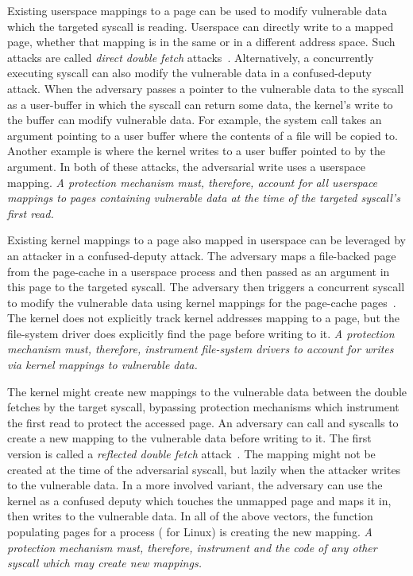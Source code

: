\documentclass[letterpaper,twocolumn,10pt]{article}
\begin{document}
Existing userspace mappings to a page can be used to modify 
vulnerable data which the targeted syscall is reading.
Userspace can directly write to a mapped page, whether that mapping is 
in the same or in a different address space. 
Such attacks are called \emph{direct double fetch} 
attacks~\cite{watson2007exploiting}.
Alternatively, a concurrently executing syscall can also modify the 
vulnerable data in a confused-deputy attack.
When the adversary passes a pointer to the vulnerable data to 
the syscall as a user-buffer in which the syscall can return some 
data, the kernel's write to the buffer can modify vulnerable data.
For example, the  system call takes an argument pointing 
to a user buffer where the contents of a file will be copied to.
Another example is  where the kernel writes to 
a user buffer pointed to by the  argument.
In both of these attacks, the adversarial write uses a userspace
mapping. 
\emph{A protection mechanism must, therefore, account for all userspace 
mappings to pages containing vulnerable data at the time of the 
targeted syscall's first read.}

Existing kernel mappings to a page also mapped in userspace can be 
leveraged by an attacker in a confused-deputy attack.
The adversary maps a file-backed page from the page-cache in a
userspace process and then passed as an argument in this page to the 
targeted syscall.
The adversary then triggers a concurrent  syscall to modify the 
vulnerable data using kernel mappings for the page-cache
pages~\cite{watson2007exploiting}.
The kernel does not explicitly track kernel addresses mapping to a page, 
but the file-system driver does explicitly find the page before writing to it.
\emph{A protection mechanism must, therefore, instrument file-system 
drivers to account for writes via kernel mappings to vulnerable data.}

The kernel might create new mappings to the vulnerable data 
between the double fetches by the target syscall, bypassing protection 
mechanisms which instrument the first read to protect the accessed page.
An adversary can call  and  syscalls to create 
a new mapping to the vulnerable data before writing to it.
The first version is called a \emph{reflected double fetch} 
attack~\cite{watson2007exploiting}.
The mapping might not be created at the time of the adversarial syscall, 
but lazily when the attacker writes to the vulnerable data.
In a more involved variant, the adversary can use the kernel as a 
confused deputy which touches the unmapped page and maps it in, 
then writes to the vulnerable data.
In all of the above vectors, the function populating pages for a 
process ( for Linux) is creating the new mapping.
\emph{A protection mechanism must, therefore, instrument 
and the code of any other syscall which may create new mappings.}
\end{document}
